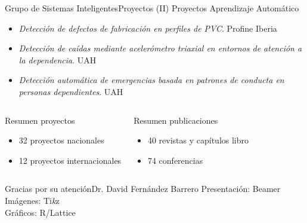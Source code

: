 \documentclass[10pt,compress]{beamer} %
\begin{document}
\begin{frame}{Grupo de Sistemas Inteligentes}{Proyectos (II)}
    Proyectos Aprendizaje Automático
        \begin{itemize}
            \item \textit{Detección de defectos de fabricación en perfiles de PVC}. Profine Iberia
            \item \textit{Detección de caídas mediante acelerómetro triaxial en entornos de atención a la dependencia}. UAH
            \item \textit{Detección automática de emergencias basada en patrones de conducta en personas dependientes}. UAH
        \end{itemize}
    
    \begin{columns}
             \begin{block}{Resumen proyectos}
                \begin{itemize}
                \item 32 proyectos nacionales
                \item 12 proyectos internacionales
              \end{itemize}
             \end{block}
              \begin{block}{Resumen publicaciones}
                \begin{itemize}
                \item 40 revistas y capítulos libro
                \item 74 conferencias
              \end{itemize}
             \end{block}
    \end{columns}

    \note{
    }  
\end{frame}

{
    \sectionheaderWhite %
    \begin{frame}[plain]{Gracias por su atención}{Dr. David Fernández Barrero}
    \small{
    Presentación: Beamer\\
    Imágenes: Ti\emph{k}z\\
    Gráficos: R/Lattice
    }
    \end{frame}
}
\end{document}

